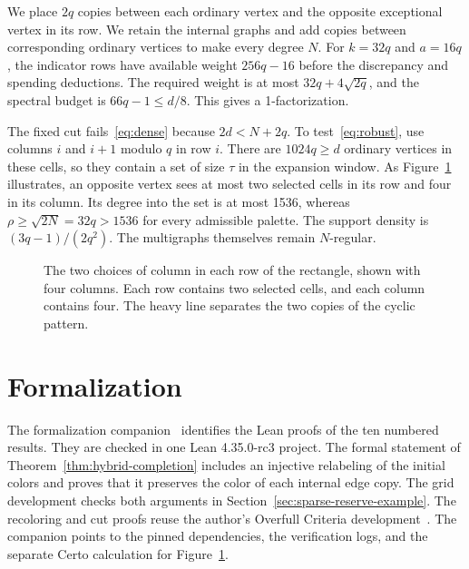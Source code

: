 \documentclass[11pt]{article}
\begin{document}
We place \(2q\) copies between each ordinary vertex and the opposite exceptional vertex in its row. We retain the internal graphs and add copies between corresponding ordinary vertices to make every degree \(N\). For \(k=32q\) and \(a=16q\), the indicator rows have available weight \(256q-16\) before the discrepancy and spending deductions. The required weight is at most \(32q+4\sqrt{2q}\), and the spectral budget is \(66q-1\le d/8\). This gives a 1-factorization.

The fixed cut fails~\eqref{eq:dense} because \(2d<N+2q\). To test~\eqref{eq:robust}, use columns \(i\) and \(i+1\) modulo \(q\) in row \(i\). There are \(1024q\ge d\) ordinary vertices in these cells, so they contain a set of size \(\tau\) in the expansion window. As Figure~\ref{fig:rectangle} illustrates, an opposite vertex sees at most two selected cells in its row and four in its column. Its degree into the set is at most 1536, whereas \(\rho\ge\sqrt{2N}=32q>1536\) for every admissible palette. The support density is \((3q-1)/(2q^2)\). The multigraphs themselves remain \(N\)-regular.

\begin{figure}[ht]
\centering
{}
\caption{The two choices of column in each row of the rectangle, shown with four columns. Each row contains two selected cells, and each column contains four. The heavy line separates the two copies of the cyclic pattern.}\label{fig:rectangle}
\end{figure}




\section{Formalization}

The formalization companion~\cite{WECRCompanion} identifies the Lean proofs of the ten numbered results. They are checked in one Lean 4.35.0-rc3 project. The formal statement of Theorem~\ref{thm:hybrid-completion} includes an injective relabeling of the initial colors and proves that it preserves the color of each internal edge copy. The grid development checks both arguments in Section~\ref{sec:sparse-reserve-example}. The recoloring and cut proofs reuse the author's Overfull Criteria development~\cite{TraversoOverfull}. The companion points to the pinned dependencies, the verification logs, and the separate Certo calculation for Figure~\ref{fig:rectangle}.
\end{document}
